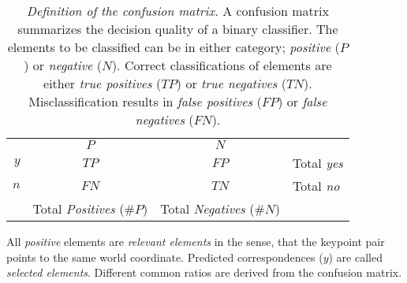 {\renewcommand{\arraystretch}{1.2}%
\begin{table}[H]
\setlength\tabcolsep{0.5em}
\begin{tabular}{r|c|c|l}
    \multicolumn{1}{r}{} &
    \multicolumn{1}{c}{$P$} &
    \multicolumn{1}{c}{$N$} &
    \multicolumn{1}{l}{} \\
  \cline{2-3}
  $y$ & $TP$  & $FP$ & Total \emph{yes} \\
  \cline{2-3}
  $n$ & $FN$  & $TN$ & Total \emph{no} \\
  \cline{2-3}
    \multicolumn{1}{r}{} &
    \multicolumn{1}{c}{Total \emph{Positives} ($\#P$)} &
    \multicolumn{1}{c}{Total \emph{Negatives} ($\#N$)}
\end{tabular}
\caption[Definition of the confusion matrix]{\emph{Definition of the confusion matrix.} A confusion matrix summarizes the decision quality of a binary classifier. The elements to be classified can be in either category; \emph{positive} ($P$) or \emph{negative} ($N$). Correct classifications of elements are either \emph{true positives} ($TP$) or \emph{true negatives} ($TN$). Misclassification results in \emph{false positives} ($FP$) or \emph{false negatives} ($FN$).}\label{tab:def_confusion_matrix}
\end{table}}

All \emph{positive} elements are \emph{relevant elements} in the sense, that the keypoint pair points to the same world coordinate.
Predicted correspondences ($y$) are called \emph{selected elements}.
Different common ratios are derived from the confusion matrix.

